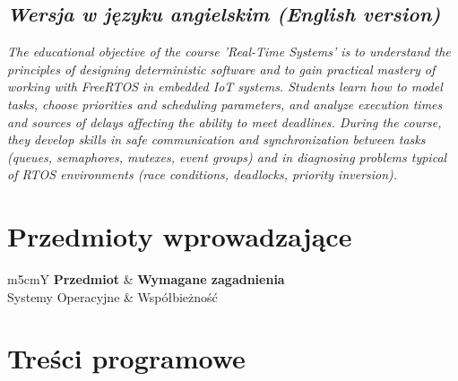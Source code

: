 \documentclass[12pt, a4paper]{article}
\newcommand{\thdrule}{\noalign{\global\setlength{\extrarowheight}{0pt}}}
\newcommand{\thdend}{\noalign{\global\setlength{\extrarowheight}{3pt}}}
\begin{document}
\subsection*{\textit{Wersja w języku angielskim (English version)}}

\textit{The educational objective of the course 'Real-Time Systems' is to understand the principles of designing deterministic software and to gain practical mastery of working with FreeRTOS in embedded IoT systems. Students learn how to model tasks, choose priorities and scheduling parameters, and analyze execution times and sources of delays affecting the ability to meet deadlines. During the course, they develop skills in safe communication and synchronization between tasks (queues, semaphores, mutexes, event groups) and in diagnosing problems typical of RTOS environments (race conditions, deadlocks, priority inversion).}


\section{Przedmioty wprowadzające}

{\scriptsize
\begin{tabularx}{\textwidth}{m{5cm}Y}
\thdrule\toprule
{} {\color{white}\textbf{Przedmiot}} & {\color{white}\textbf{Wymagane zagadnienia}} \\
\midrule\thdend
   Systemy Operacyjne & Współbieżność \\
\bottomrule
\end{tabularx}}

\section{Treści programowe}
\end{document}
